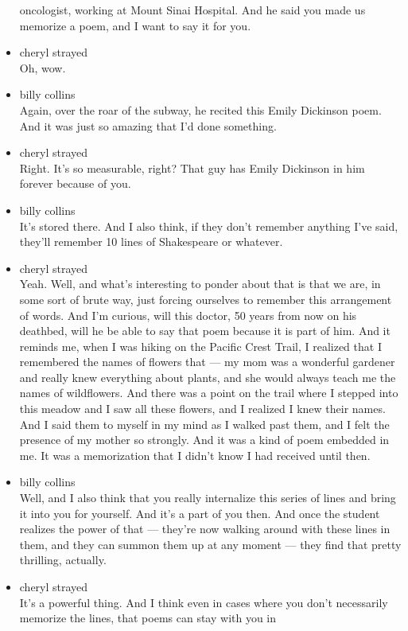 \begin{itemize}
  oncologist, working at Mount Sinai Hospital. And he said you made us
  memorize a poem, and I want to say it for you.
\item
  cheryl strayed\\
  Oh, wow.
\item
  billy collins\\
  Again, over the roar of the subway, he recited this Emily Dickinson
  poem. And it was just so amazing that I'd done something.
\item
  cheryl strayed\\
  Right. It's so measurable, right? That guy has Emily Dickinson in him
  forever because of you.
\item
  billy collins\\
  It's stored there. And I also think, if they don't remember anything
  I've said, they'll remember 10 lines of Shakespeare or whatever.
\item
  cheryl strayed\\
  Yeah. Well, and what's interesting to ponder about that is that we
  are, in some sort of brute way, just forcing ourselves to remember
  this arrangement of words. And I'm curious, will this doctor, 50 years
  from now on his deathbed, will he be able to say that poem because it
  is part of him. And it reminds me, when I was hiking on the Pacific
  Crest Trail, I realized that I remembered the names of flowers that
  --- my mom was a wonderful gardener and really knew everything about
  plants, and she would always teach me the names of wildflowers. And
  there was a point on the trail where I stepped into this meadow and I
  saw all these flowers, and I realized I knew their names. And I said
  them to myself in my mind as I walked past them, and I felt the
  presence of my mother so strongly. And it was a kind of poem embedded
  in me. It was a memorization that I didn't know I had received until
  then.
\item
  billy collins\\
  Well, and I also think that you really internalize this series of
  lines and bring it into you for yourself. And it's a part of you then.
  And once the student realizes the power of that --- they're now
  walking around with these lines in them, and they can summon them up
  at any moment --- they find that pretty thrilling, actually.
\item
  cheryl strayed\\
  It's a powerful thing. And I think even in cases where you don't
  necessarily memorize the lines, that poems can stay with you in

\end{itemize}

